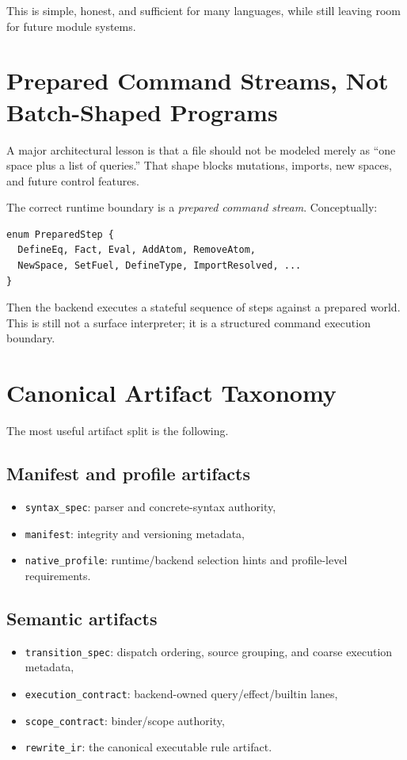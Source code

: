 \documentclass[11pt]{article}
\begin{document}
This is simple, honest, and sufficient for many languages, while still leaving room for future module systems.

\section{Prepared Command Streams, Not Batch-Shaped Programs}

A major architectural lesson is that a file should not be modeled merely as ``one space plus a list of queries.'' That shape blocks mutations, imports, new spaces, and future control features.

The correct runtime boundary is a \emph{prepared command stream}. Conceptually:

\begin{verbatim}
enum PreparedStep {
  DefineEq, Fact, Eval, AddAtom, RemoveAtom,
  NewSpace, SetFuel, DefineType, ImportResolved, ...
}
\end{verbatim}

Then the backend executes a stateful sequence of steps against a prepared world. This is still not a surface interpreter; it is a structured command execution boundary.

\section{Canonical Artifact Taxonomy}

The most useful artifact split is the following.

\subsection{Manifest and profile artifacts}
\begin{itemize}
  \item \texttt{syntax\_spec}: parser and concrete-syntax authority,
  \item \texttt{manifest}: integrity and versioning metadata,
  \item \texttt{native\_profile}: runtime/backend selection hints and profile-level requirements.
\end{itemize}

\subsection{Semantic artifacts}
\begin{itemize}
  \item \texttt{transition\_spec}: dispatch ordering, source grouping, and coarse execution metadata,
  \item \texttt{execution\_contract}: backend-owned query/effect/builtin lanes,
  \item \texttt{scope\_contract}: binder/scope authority,
  \item \texttt{rewrite\_ir}: the canonical executable rule artifact.
\end{itemize}
\end{document}
